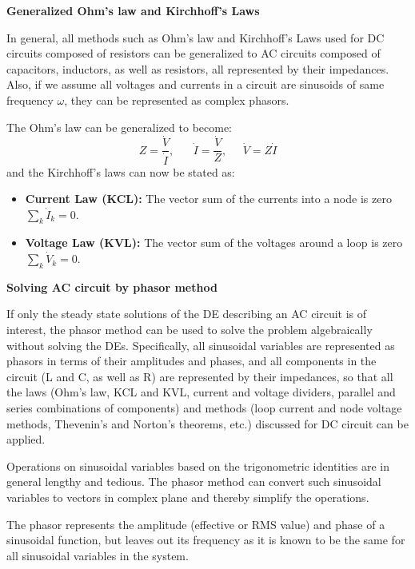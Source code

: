 {\bf Generalized Ohm's law and Kirchhoff's Laws}

In general, all methods such as Ohm's law and Kirchhoff's Laws used for DC 
circuits composed of resistors can be generalized to AC circuits composed 
of capacitors, inductors, as well as resistors, all represented by their
impedances. Also, if we assume all voltages and currents in a circuit are 
sinusoids of same frequency $\omega$, they can be represented as complex 
phasors.

The Ohm's law can be generalized to become:
\[ Z=\frac{\dot{V}}{\dot{I}},\;\;\;\;\;\;\dot{I}=\frac{\dot{V}}{Z},
\;\;\;\;\;\dot{V}=Z\dot{I} \]
and the Kirchhoff's laws can now be stated as:
\begin{itemize}
\item {\bf Current Law (KCL):} The vector sum of the currents into a node
  is zero $\sum_k \dot{I}_k=0$.
\item {\bf Voltage Law (KVL):} The vector sum of the voltages around a loop 
  is zero $\sum_k \dot{V}_k=0$.
\end{itemize}


{\bf Solving AC circuit by phasor method}

If only the steady state solutions of the DE describing an AC circuit is of 
interest, the phasor method can be used to solve the problem algebraically 
without solving the DEs. Specifically, all sinusoidal variables are represented 
as phasors in terms of their amplitudes and phases, and all components in the 
circuit (L and C, as well as R) are represented by their impedances, so that 
all the laws (Ohm's law, KCL and KVL, current and voltage dividers, parallel 
and series combinations of components) and methods (loop current and node 
voltage methods, Thevenin's and Norton's theorems, etc.) discussed for DC 
circuit can be applied.


Operations on sinusoidal variables based on the trigonometric identities
are in general lengthy and tedious. The phasor method can convert such 
sinusoidal variables to vectors in complex plane and thereby simplify the 
operations. 

The phasor represents the amplitude (effective or RMS value) and phase of a 
sinusoidal function, but leaves out its frequency as it is known to be the
same for all sinusoidal variables in the system.


